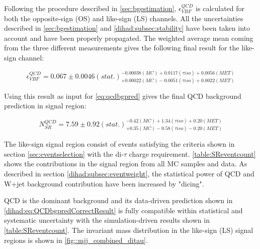 Following the procedure described in \autoref{sec:bgestimation}, $\epsilon^{QCD}_{VBF}$ is calculated for both the opposite-sign (OS) and like-sign (LS) channels. All the uncertainties described in \autoref{sec:bgestimation} and \autoref{dihad:subsec:stability} have been taken into account and have been properly propagated. The weighted average mean coming from the three different measurements gives the following final result for the like-sign channel:

\begin{equation}
\epsilon^{QCD}_{VBF} = 0.067\pm0.0046(stat.)^{-0.00038(MC)+0.0117(\tau iso)+0.0056(MET)}_{+0.00022(MC)-0.0051(\tau iso)+0.0022(MET)}
\label{eq:vbfefflsresult}
\end{equation}

Using this result as input for \autoref{eq:qcdbgpred} gives the final QCD background prediction in signal region:

\begin{equation}
N^{QCD}_{SR} = 7.59\pm0.92(stat.)^{-0.42(MC)+1.34(\tau iso)+0.20(MET)}_{+0.35(MC)-0.58(\tau iso)-0.20(MET)}
\label{dihad:eq:QCDbgpredCorrectResult}
\end{equation}

The like-sign signal region consist of events satisfying the criteria shown in section \ref{sec:eventselection} with the di-$\tau$ charge requirement. \autoref{table:SReventcount} shows the contributions in the signal region from all MC samples and data. As described in section \ref{dihad:subsec:eventweight}, the statistical power of QCD and W+jet  background contribution have been increased by "dicing". 

QCD is the dominant background and its data-driven prediction shown in \autoref{dihad:eq:QCDbgpredCorrectResult} is fully compatible within statistical and systematic uncertainty with the simulation-driven results shown in \autoref{table:SReventcount}. The \mjj invariant mass distribution in the like-sign (LS) \hadtau \hadtau signal regions is shown in \autoref{fig::mjj_combined_ditau}.


